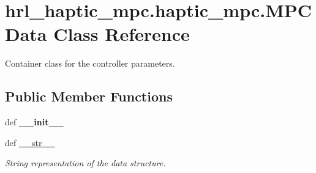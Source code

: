 \hypertarget{classhrl__haptic__mpc_1_1haptic__mpc_1_1_m_p_c_data}{\section{hrl\-\_\-haptic\-\_\-mpc.\-haptic\-\_\-mpc.\-M\-P\-C\-Data \-Class \-Reference}
\label{classhrl__haptic__mpc_1_1haptic__mpc_1_1_m_p_c_data}
}


\-Container class for the controller parameters.  


\subsection*{\-Public \-Member \-Functions}
\begin{DoxyCompactItemize}
\item 
\hypertarget{classhrl__haptic__mpc_1_1haptic__mpc_1_1_m_p_c_data_aead28988a10f4cd26224f97a698c142e}{def {\bfseries \-\_\-\-\_\-init\-\_\-\-\_\-}}\label{classhrl__haptic__mpc_1_1haptic__mpc_1_1_m_p_c_data_aead28988a10f4cd26224f97a698c142e}

\item 
def \hyperlink{classhrl__haptic__mpc_1_1haptic__mpc_1_1_m_p_c_data_a76cc6203a92a4cddafe8f78d953adf43}{\-\_\-\-\_\-str\-\_\-\-\_\-}
\begin{DoxyCompactList}\small\item\em \-String representation of the data structure. \end{DoxyCompactList}\end{DoxyCompactItemize}
